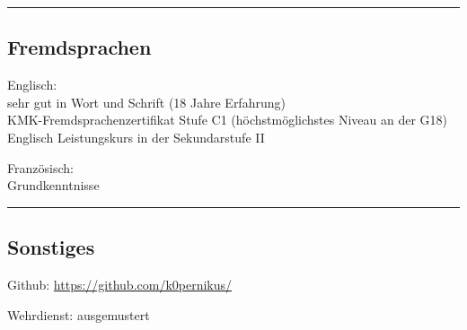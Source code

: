 \documentclass[11pt,a4paper]{article}
\newenvironment{indentsection}[1]%
{\begin{list}{}%
	{\setlength{\leftmargin}{#1}}%
	\item[]%
}
{\end{list}}
\begin{document}
\hrule
\vspace{-0.4em}
\subsection*{Fremdsprachen}

\begin{indentsection}{\parindent}
	\begin{description*}
		\item[Englisch:] ~\\ sehr gut in Wort und Schrift (18 Jahre Erfahrung) \\ KMK-Fremdsprachenzertifikat Stufe C1 (höchstmöglichstes Niveau an der G18) \\ Englisch Leistungskurs in der Sekundarstufe II
		\item[Französisch:] ~\\ Grundkenntnisse
	\end{description*}
\end{indentsection}

\hrule
\vspace{-0.4em}
\subsection*{Sonstiges}

\begin{indentsection}{\parindent}
	\begin{description*}
	  \item[Github:] \url{https://github.com/k0pernikus/}
		\item[Wehrdienst:] ausgemustert
	\end{description*}
\end{indentsection}
\end{document}
